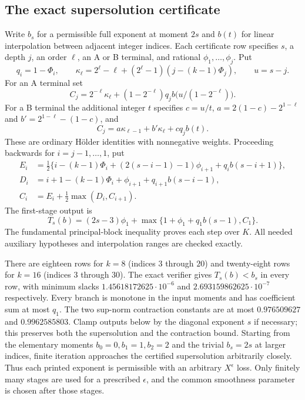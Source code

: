 \documentclass[11pt,reqno]{amsart}
\numberwithin{equation}{section}
\theoremstyle{definition}
\begin{document}
\subsection{The exact supersolution certificate}
Write $b_s$ for a permissible full exponent at moment $2s$ and $b(t)$ for
linear interpolation between adjacent integer indices. Each certificate
row specifies $s$, a depth $j$, an order $\ell$, an A or B terminal,
and rational $\phi_1,\ldots,\phi_j$. Put
\[
 q_i=1-\Phi_i,\qquad
 \kappa_\ell=2^\ell-\ell+(2^\ell-1)(j-(k-1)\Phi_j),\qquad u=s-j.
\]
For an A terminal set
\[
 C_j=2^{-\ell}\kappa_\ell+
        (1-2^{-\ell})q_j b\bigl(u/(1-2^{-\ell})\bigr).
\]
For a B terminal the additional integer $t$ specifies
$c=u/t$, $a=2(1-c)-2^{1-\ell}$ and
$b'=2^{1-\ell}-(1-c)$, and
\[
 C_j=a\kappa_{\ell-1}+b'\kappa_\ell+cq_jb(t).
\]
These are ordinary H\"older identities with nonnegative weights.
Proceeding backwards for $i=j-1,\ldots,1$, put
\[
 \begin{split}
 E_i&=\tfrac12\{i-(k-1)\Phi_i+(2(s-i-1)-1)\phi_{i+1}
                                      +q_i b(s-i+1)\},\\
 D_i&=i+1-(k-1)\Phi_i+\phi_{i+1}+q_{i+1}b(s-i-1),\\
 C_i&=E_i+\tfrac12\max(D_i,C_{i+1}).
 \end{split}
\]
The first-stage output is
\[
 T_s(b)=(2s-3)\phi_1+
             \max\{1+\phi_1+q_1b(s-1),C_1\}.
\]
The fundamental principal-block inequality proves each step over $K$.
All needed auxiliary hypotheses and interpolation ranges are checked exactly.

There are eighteen rows for $k=8$ (indices $3$ through $20$) and twenty-eight
rows for $k=16$ (indices $3$ through $30$).
The exact verifier gives $T_s(b)<b_s$ in every row, with minimum slacks
$1.45618172625\cdot10^{-6}$ and $2.693159862625\cdot10^{-7}$ respectively.
Every branch is monotone in the input moments and has coefficient sum at
most $q_1$. The two sup-norm contraction constants are at most
$0.976509627$ and $0.9962585803$. Clamp outputs below by the diagonal
exponent $s$ if necessary; this preserves both the supersolution and the
contraction bound. Starting from the elementary moments $b_0=0,b_1=1,b_2=2$
and the trivial $b_s=2s$ at larger indices, finite iteration approaches the
certified supersolution arbitrarily closely. Thus each printed exponent is
permissible with an arbitrary $X^\epsilon$ loss. Only finitely many stages
are used for a prescribed $\epsilon$, and the common smoothness parameter
is chosen after those stages.
\end{document}
